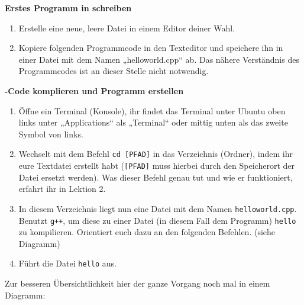 \begin{praxis}

    \textbf{Erstes Programm in \Cpp schreiben}

    \begin{enumerate}
        \item Erstelle eine neue, leere Datei in einem Editor deiner Wahl.
        
        \item Kopiere folgenden Programmcode in den Texteditor und speichere ihn in einer Datei mit dem Namen „helloworld.cpp“ ab. 
        Das nähere Verständnis des Programmcodes ist an dieser Stelle nicht notwendig. 
    \end{enumerate}    


    \textbf{\Cpp-Code komplieren und Programm erstellen }
  
    \begin{enumerate}
        \item Öffne ein Terminal (Konsole), ihr findet das Terminal unter Ubuntu oben links unter „Applications“ als „Terminal“ oder mittig unten als das zweite Symbol von links.
        \item Wechselt mit dem Befehl \texttt{cd [PFAD]} in das Verzeichnis (Ordner), indem ihr eure Textdatei erstellt habt (\texttt{[PFAD]} muss hierbei durch den Speicherort der Datei ersetzt werden).
              Was dieser Befehl genau tut und wie er funktioniert, erfahrt ihr in Lektion 2.
        \item In diesem Verzeichnis liegt nun eine Datei mit dem Namen \texttt{helloworld.cpp}.
              Benutzt \texttt{g++}, um diese zu einer Datei (in diesem Fall dem Programm) \texttt{hello} zu
              kompilieren. Orientiert euch dazu an den folgenden Befehlen. (siehe Diagramm)
        \item Führt die Datei \texttt{hello} aus.
    \end{enumerate}
\end{praxis}


Zur besseren Übersichtlichkeit hier der ganze Vorgang noch mal in einem
Diagramm:

\begin{center}
\end{center}

